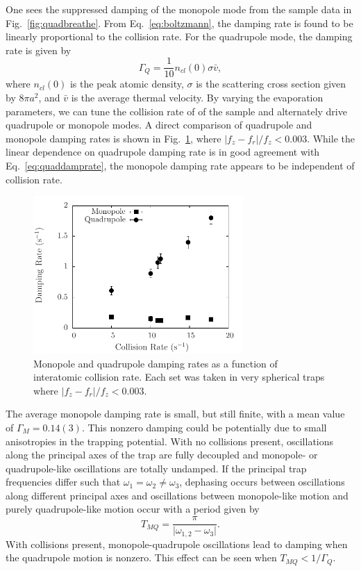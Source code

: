 \documentclass[%
 reprint,
 amsmath,amssymb,
 aps,
]{revtex4-1}
\begin{document}
One sees the suppressed damping of the monopole mode from the sample data in Fig.~\ref{fig:quadbreathe}. From Eq.~\ref{eq:boltzmann}, the damping rate is found to be linearly proportional to the collision rate. For the quadrupole mode, the damping rate is given by
\begin{equation}
\Gamma_Q = \frac{1}{10} n_{cl}\left(0\right)\sigma \bar{v},
\label{eq:quaddamprate}
\end{equation} 
where $n_{cl}\left(0\right)$ is the peak atomic density, $\sigma$ is the scattering cross section given by $8\pi a^2$, and $\bar{v}$ is the average thermal velocity. By varying the evaporation parameters, we can tune the collision rate of of the sample and alternately drive quadrupole or monopole modes. A direct comparison of quadrupole and monopole damping rates is shown in Fig.~\ref{fig:qbdamp}, where $\vert f_z-f_r\vert/f_z < 0.003$. While the linear dependence on quadrupole damping rate is in good agreement with Eq.~\ref{eq:quaddamprate}, the monopole damping rate appears to be independent of collision rate.
\begin{figure}[htbl!]
    \begin{center}
    \includegraphics[width=80mm]{./figs/QuadBreathevsCollf3.pdf}
    \end{center}
    \caption[qbdamp]{
        Monopole and quadrupole damping rates as a function of interatomic collision rate. Each set was taken in very spherical traps where $\vert f_z-f_r\vert/f_z < 0.003$.
    }
    \label{fig:qbdamp}
\end{figure}

The average monopole damping rate is small, but still finite, with a mean value of $\Gamma_M = 0.14(3)$. This nonzero damping could be potentially due to small anisotropies in the trapping potential. With no collisions present, oscillations along the principal axes of the trap are fully decoupled and monopole- or quadrupole-like oscillations are totally undamped. If the principal trap frequencies differ such that $\omega_1=\omega_2\neq\omega_3$, dephasing occurs between oscillations along different principal axes and oscillations between monopole-like motion and purely quadrupole-like motion occur with a period given by
\begin{equation}
T_{MQ} = \frac{\pi}{\vert\omega_{1,2}-\omega_3\vert}.
\end{equation}
With collisions present, monopole-quadrupole oscillations lead to damping when the quadrupole motion is nonzero. This effect can be seen when $T_{MQ} < 1/\Gamma_Q$.
\end{document}
